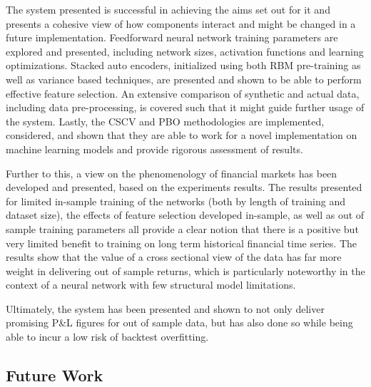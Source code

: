 \documentclass[a4paper,11pt,oneside]{article}
\theoremstyle{plain}
\theoremstyle{definition}
\begin{document}
	The system presented is successful in achieving the aims set out for it and presents a cohesive view of how components interact and might be changed in a future implementation. Feedforward neural network training parameters are explored and presented, including network sizes, activation functions and learning optimizations. Stacked auto encoders, initialized using both RBM pre-training as well as variance based techniques, are presented and shown to be able to perform effective feature selection. An extensive comparison of synthetic and actual data, including data pre-processing, is covered such that it might guide further usage of the system. Lastly, the CSCV and PBO methodologies are implemented, considered, and shown that they are able to work for a novel implementation on machine learning models and provide rigorous assessment of results. \newline 
	
	Further to this, a view on the phenomenology of financial markets has been developed and presented, based on the experiments results. The results presented for limited in-sample training of the networks (both by length of training and dataset size), the effects of feature selection developed in-sample, as well as out of sample training parameters all provide a clear notion that there is a positive but very limited benefit to training on long term historical financial time series. The results show that the value of a cross sectional view of the data has far more weight in delivering out of sample returns, which is particularly noteworthy in the context of a neural network with few structural model limitations. \newline 
	
	Ultimately, the system has been presented and shown to not only deliver promising P\&L figures for out of sample data, but has also done so while being able to incur a low risk of backtest overfitting.
	
	\subsection{Future Work}
	
\end{document}
